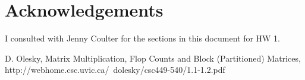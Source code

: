 \documentclass[]{article}
\begin{document}
\section{Acknowledgements}
I consulted with Jenny Coulter for the sections in this document for HW 1. 

  \begin{thebibliography}{1}
  	
  	 D. Olesky, Matrix Multiplication, Flop Counts and Block (Partitioned) Matrices, http://webhome.csc.uvic.ca/~dolesky/csc449-540/1.1-1.2.pdf

  \end{thebibliography}
\end{document}
